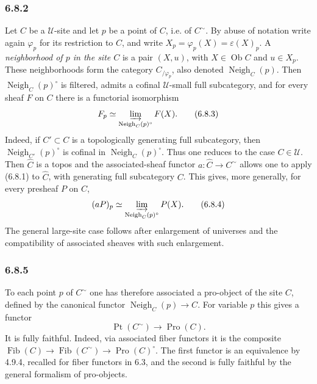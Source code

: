 \documentclass[11pt]{article}
\newcommand{\U}{\mathcal{U}}
\newcommand{\Ob}{\operatorname{Ob}}
\newcommand{\Ppoint}{\operatorname{Pt}}
\newcommand{\Ffib}{\operatorname{Fib}}
\newcommand{\Vvois}{\operatorname{Neigh}}
\providecommand{\Ob}{\operatorname{Ob}}
\begin{document}
\subsubsection*{6.8.2}
Let \(C\) be a \(\U\)-site and let \(p\) be a point of \(C\), i.e. of \(C^{\sim}\). By abuse of notation write again \(\varphi_p\) for its restriction to \(C\), and write \(X_p=\varphi_p(X)=\varepsilon(X)_p\). A \emph{neighborhood of \(p\) in the site \(C\)} is a pair \((X,u)\), with \(X\in\Ob C\) and \(u\in X_p\). These neighborhoods form the category \(C_{/\varphi_p}\), also denoted \(\Vvois_C(p)\). Then \(\Vvois_C(p)^\circ\) is filtered, admits a cofinal \(\U\)-small full subcategory, and for every sheaf \(F\) on \(C\) there is a functorial isomorphism
\begin{equation*}
F_p\simeq\varinjlim_{\Vvois_C(p)^\circ}F(X).\tag{6.8.3}
\end{equation*}
Indeed, if \(C'\subset C\) is a topologically generating full subcategory, then \(\Vvois_{C'}(p)^\circ\) is cofinal in \(\Vvois_C(p)^\circ\). Thus one reduces to the case \(C\in\U\). Then \(\widehat C\) is a topos and the associated-sheaf functor \(a:\widehat C\to C^{\sim}\) allows one to apply (6.8.1) to \(\widehat C\), with generating full subcategory \(C\). This gives, more generally, for every presheaf \(P\) on \(C\),
\begin{equation*}
(aP)_p\simeq\varinjlim_{\Vvois_C(p)^\circ}P(X).\tag{6.8.4}
\end{equation*}
The general large-site case follows after enlargement of universes and the compatibility of associated sheaves with such enlargement.

\subsubsection*{6.8.5}
To each point \(p\) of \(C^{\sim}\) one has therefore associated a pro-object of the site \(C\), defined by the canonical functor \(\Vvois_C(p)\to C\). For variable \(p\) this gives a functor
\begin{equation*}
\Ppoint(C^{\sim})\longrightarrow\operatorname{Pro}(C).\tag{6.8.5.1}
\end{equation*}
It is fully faithful. Indeed, via associated fiber functors it is the composite \(\Ffib(C)\to\Ffib(C^{\sim})\to\operatorname{Pro}(C)^\circ\). The first functor is an equivalence by 4.9.4, recalled for fiber functors in 6.3, and the second is fully faithful by the general formalism of pro-objects.
\end{document}
